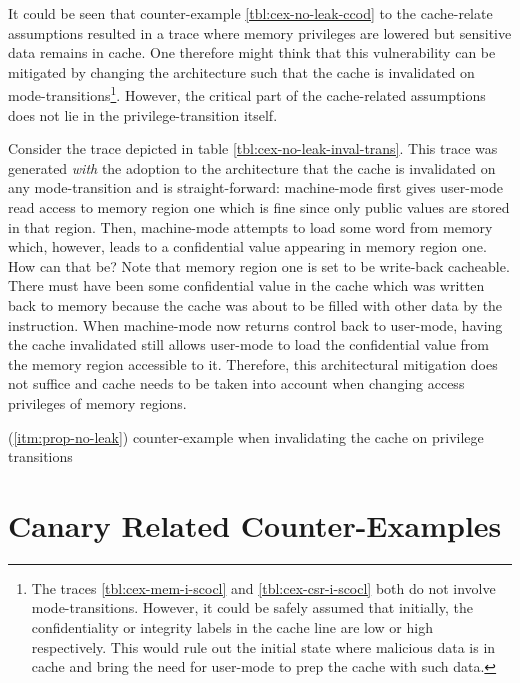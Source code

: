 It could be seen that counter-example \ref{tbl:cex-no-leak-ccod} to the cache-relate assumptions  resulted in a trace where memory privileges are lowered but sensitive data remains in cache.
One therefore might think that this vulnerability can be mitigated by changing the architecture such that the cache is invalidated on mode-transitions\footnote{%
    The traces \ref{tbl:cex-mem-i-scocl} and \ref{tbl:cex-csr-i-scocl} both do not involve mode-transitions.
    However, it could be safely assumed that initially, the confidentiality or integrity labels in the cache line are low or high respectively.
    This would rule out the initial state where malicious data is in cache and bring the need for user-mode to prep the cache with such data.
}.
However, the critical part of the cache-related assumptions does not lie in the privilege-transition itself.

Consider the trace depicted in table \ref{tbl:cex-no-leak-inval-trans}.
This trace was generated \textit{with} the adoption to the architecture that the cache is invalidated on any mode-transition and is straight-forward:
machine-mode first gives user-mode read access to memory region one which is fine since only public values are stored in that region.
Then, machine-mode attempts to load some word from memory which, however, leads to a confidential value appearing in memory region one.
How can that be?
Note that memory region one is set to be write-back cacheable.
There must have been some confidential value in the cache which was written back to memory because the cache was about to be filled with other data by the  instruction.
When machine-mode now returns control back to user-mode, having the cache invalidated still allows user-mode to load the confidential value from the memory region accessible to it.
Therefore, this architectural mitigation does not suffice and cache needs to be taken into account when changing access privileges of memory regions.

\begin{table}
    \centering
    
    \caption{ (\ref{itm:prop-no-leak}) counter-example when invalidating the cache on privilege transitions}
    \label{tbl:cex-no-leak-inval-trans}
\end{table}

\section{Canary Related Counter-Examples}
\label{sec:cexs-canaries}


